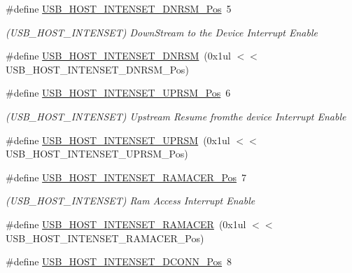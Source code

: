 \begin{DoxyCompactItemize}
\item 
\#define \mbox{\hyperlink{group___s_a_m_d21___u_s_b_gaa3de4dc6e13807025e0156bf72ed2c53}{U\+S\+B\+\_\+\+H\+O\+S\+T\+\_\+\+I\+N\+T\+E\+N\+S\+E\+T\+\_\+\+D\+N\+R\+S\+M\+\_\+\+Pos}}~5
\begin{DoxyCompactList}\small\item\em (U\+S\+B\+\_\+\+H\+O\+S\+T\+\_\+\+I\+N\+T\+E\+N\+S\+ET) Down\+Stream to the Device Interrupt Enable \end{DoxyCompactList}\item 
\#define \mbox{\hyperlink{group___s_a_m_d21___u_s_b_gac81e80d7e5680dc989e6b9b1aba7ac11}{U\+S\+B\+\_\+\+H\+O\+S\+T\+\_\+\+I\+N\+T\+E\+N\+S\+E\+T\+\_\+\+D\+N\+R\+SM}}~(0x1ul $<$$<$ U\+S\+B\+\_\+\+H\+O\+S\+T\+\_\+\+I\+N\+T\+E\+N\+S\+E\+T\+\_\+\+D\+N\+R\+S\+M\+\_\+\+Pos)
\item 
\#define \mbox{\hyperlink{group___s_a_m_d21___u_s_b_ga447cdc0932f5fadd6ca31dabbf7ed24f}{U\+S\+B\+\_\+\+H\+O\+S\+T\+\_\+\+I\+N\+T\+E\+N\+S\+E\+T\+\_\+\+U\+P\+R\+S\+M\+\_\+\+Pos}}~6
\begin{DoxyCompactList}\small\item\em (U\+S\+B\+\_\+\+H\+O\+S\+T\+\_\+\+I\+N\+T\+E\+N\+S\+ET) Upstream Resume fromthe device Interrupt Enable \end{DoxyCompactList}\item 
\#define \mbox{\hyperlink{group___s_a_m_d21___u_s_b_ga113619d8b57aecb308c0adb79c029053}{U\+S\+B\+\_\+\+H\+O\+S\+T\+\_\+\+I\+N\+T\+E\+N\+S\+E\+T\+\_\+\+U\+P\+R\+SM}}~(0x1ul $<$$<$ U\+S\+B\+\_\+\+H\+O\+S\+T\+\_\+\+I\+N\+T\+E\+N\+S\+E\+T\+\_\+\+U\+P\+R\+S\+M\+\_\+\+Pos)
\item 
\#define \mbox{\hyperlink{group___s_a_m_d21___u_s_b_gaabaa6f4dc758d21af2306fa941a13363}{U\+S\+B\+\_\+\+H\+O\+S\+T\+\_\+\+I\+N\+T\+E\+N\+S\+E\+T\+\_\+\+R\+A\+M\+A\+C\+E\+R\+\_\+\+Pos}}~7
\begin{DoxyCompactList}\small\item\em (U\+S\+B\+\_\+\+H\+O\+S\+T\+\_\+\+I\+N\+T\+E\+N\+S\+ET) Ram Access Interrupt Enable \end{DoxyCompactList}\item 
\#define \mbox{\hyperlink{group___s_a_m_d21___u_s_b_ga1548d6541cd36d5743efea1d04412597}{U\+S\+B\+\_\+\+H\+O\+S\+T\+\_\+\+I\+N\+T\+E\+N\+S\+E\+T\+\_\+\+R\+A\+M\+A\+C\+ER}}~(0x1ul $<$$<$ U\+S\+B\+\_\+\+H\+O\+S\+T\+\_\+\+I\+N\+T\+E\+N\+S\+E\+T\+\_\+\+R\+A\+M\+A\+C\+E\+R\+\_\+\+Pos)
\item 
\#define \mbox{\hyperlink{group___s_a_m_d21___u_s_b_gaa679c274d95c23452bc912164018ad66}{U\+S\+B\+\_\+\+H\+O\+S\+T\+\_\+\+I\+N\+T\+E\+N\+S\+E\+T\+\_\+\+D\+C\+O\+N\+N\+\_\+\+Pos}}~8
$$
\end{DoxyCompactItemize}
